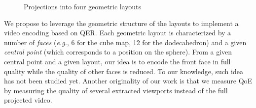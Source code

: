\begin{figure}[t]
\centering
{}
\caption{Projections into four geometric layouts}\label{fig:mapping}
\end{figure}

We propose to leverage the geometric
structure of the layouts to implement a video encoding based on
\ac{QER}. Each geometric layout is characterized by a number of
\emph{faces} (\textit{e.g.}, 6 for the cube map, 12 for the
dodecahedron) and a given \emph{central point} (which corresponds to a
position on the sphere).
From a given central point and a given layout, our idea is to encode
the front face in full quality while the quality of other faces is
reduced.
To our knowledge, such idea has not been studied yet.
Another originality of our work is that we measure \ac{QoE} by
measuring the quality of several extracted viewports instead of
the full projected video.

